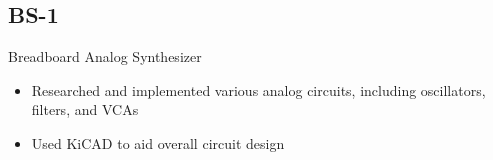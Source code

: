 \documentclass[letterpaper,10pt]{article}
\begin{document}
\begin{paracol}{2}
    \subsection*{BS-1}
    Breadboard Analog Synthesizer

    \begin{itemize}[topsep=0.5em, partopsep=0em, itemsep=0.125em]
        \item Researched and implemented various analog circuits, including oscillators, filters, and VCAs
        \item Used KiCAD to aid overall circuit design
    \end{itemize}

\end{paracol}
\end{document}
